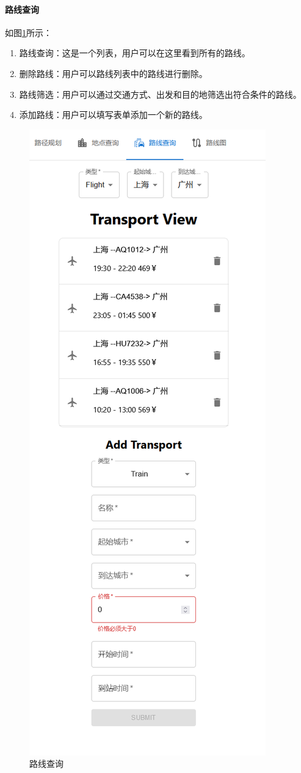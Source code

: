 \documentclass[10pt]{article}
\begin{document}
    \paragraph{路线查询} 如图\ref{fig:screenshot006}所示：
    \begin{enumerate}
        \item 路线查询：这是一个列表，用户可以在这里看到所有的路线。
        \item 删除路线：用户可以路线列表中的路线进行删除。
        \item 路线筛选：用户可以通过交通方式、出发和目的地筛选出符合条件的路线。
        \item 添加路线：用户可以填写表单添加一个新的路线。
    \end{enumerate}
    \begin{figure}
        \centering
        \includegraphics[width=0.5\linewidth]{img/screenshot006}
        \caption[]{路线查询}
        \label{fig:screenshot006}
    \end{figure}
\end{document}
